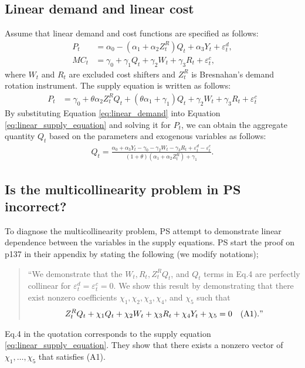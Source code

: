 \documentclass[11pt, a4paper]{article}
\begin{document}
\subsection{Linear demand and linear cost}
Assume that linear demand and cost functions are specified as follows:
\begin{align}
    P_t &= \alpha_0 - (\alpha_1 + \alpha_2Z^{R}_{t})Q_{t} + \alpha_3 Y_t + \varepsilon^{d}_{t},\label{eq:linear_demand}\\
    MC_t &= \gamma_0  + \gamma_1 Q_{t} + \gamma_2 W_{t} + \gamma_3 R_{t} + \varepsilon^{c}_{t},\label{eq:linear_marginal_cost}
\end{align}
where $W_{t}$ and $R_{t}$ are excluded cost shifters and $Z^{R}_{t}$ is Bresnahan's demand rotation instrument. 
The supply equation is written as follows:
\begin{align}
    P_t 
    &= \gamma_0 + \theta \alpha_2 Z^{R}_tQ_{t} + (\theta\alpha_1 + \gamma_1) Q_{t} + \gamma_2 W_t + \gamma_3 R_{t} +\varepsilon^c_t\label{eq:linear_supply_equation}
\end{align}
By substituting Equation \eqref{eq:linear_demand} into Equation \eqref{eq:linear_supply_equation} and solving it for $P_t$, we can obtain the aggregate quantity $Q_{t}$ based on the parameters and exogenous variables as follows:
\begin{align}
    Q_{t} =  \frac{\alpha_0 + \alpha_3 Y_t - \gamma_0 - \gamma_2 W_{t} - \gamma_3 R_{t} + \varepsilon^{d}_{t} - \varepsilon^{c}_{t}}{(1 + \theta) (\alpha_1 + \alpha_2 Z^{R}_{t}) + \gamma_1}.\label{eq:quantity_linear}
\end{align}

\subsection{Is the multicollinearity problem in PS incorrect?}
To diagnose the multicollinearity problem, PS attempt to demonstrate linear dependence between the variables in the supply equations. 
PS start the proof on p137 in their appendix by stating the following (we modify notations);
\begin{quote}
    ``We demonstrate that the $W_{t}, R_{t}, Z^{R}_{t}Q_{t}$, and $Q_{t}$ terms in Eq.4 are perfectly collinear for $\varepsilon_{t}^{d} = \varepsilon_{t}^{c} = 0$. We show this result by demonstrating that there exist nonzero coefficients $\chi_1,\chi_2,\chi_3,\chi_4$, and $\chi_5$ such that 
   \begin{align*}
    Z^{R}_{t} Q_{t} + \chi_1 Q_{t} + \chi_2 W_{t} + \chi_3 R_{t} + \chi_4 Y_{t} + \chi_5 = 0 \quad (\text{A1})."
    \end{align*}
\end{quote}
Eq.4 in the quotation corresponds to the supply equation \eqref{eq:linear_supply_equation}.
They show that there exists a nonzero vector of $\chi_1, \ldots, \chi_5$ that satisfies (A1).
\end{document}
